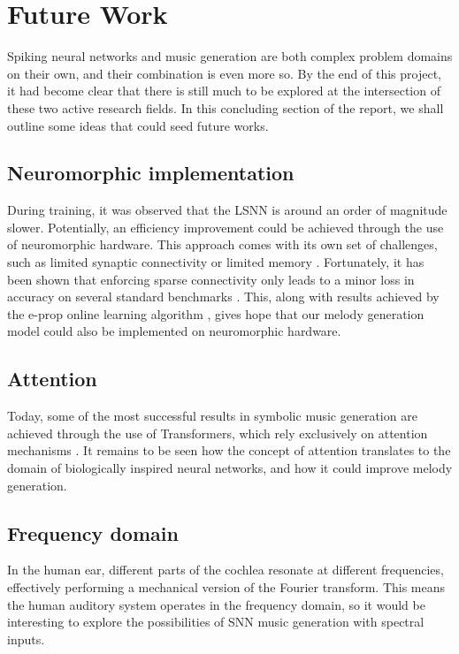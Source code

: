 \documentclass[../../report.tex]{subfiles}
\begin{document}
\section{Future Work}

Spiking neural networks and music generation are both complex problem domains on
their own, and their combination is even more so. By the end of this project, it
had become clear that there is still much to be explored at the intersection of
these two active research fields. In this concluding section of the report, we
shall outline some ideas that could seed future works.

\subsection{Neuromorphic implementation}

During training, it was observed that the LSNN is around an order of magnitude
slower. Potentially, an efficiency improvement could be achieved through the use
of neuromorphic hardware. This approach comes with its own set of challenges,
such as limited synaptic connectivity or limited memory \cite{Liu2018}.
Fortunately, it has been shown that enforcing sparse connectivity only leads to
a minor loss in accuracy on several standard benchmarks
\cite{Bellec2018Rewiring}. This, along with results achieved by the e-prop
online learning algorithm \cite{Bellec2020}, gives hope that our melody
generation model could also be implemented on neuromorphic hardware.

\subsection{Attention}

Today, some of the most successful results in symbolic music generation
\cite{Huang2018} are achieved through the use of Transformers, which rely
exclusively on attention mechanisms \cite{Vaswani2017}. It remains to be seen
how the concept of attention translates to the domain of biologically inspired
neural networks, and how it could improve melody generation.

\subsection{Frequency domain}

In the human ear, different parts of the cochlea resonate at different
frequencies, effectively performing a mechanical version of the Fourier
transform. This means the human auditory system operates in the frequency
domain, so it would be interesting to explore the possibilities of SNN music
generation with spectral inputs.
\end{document}
